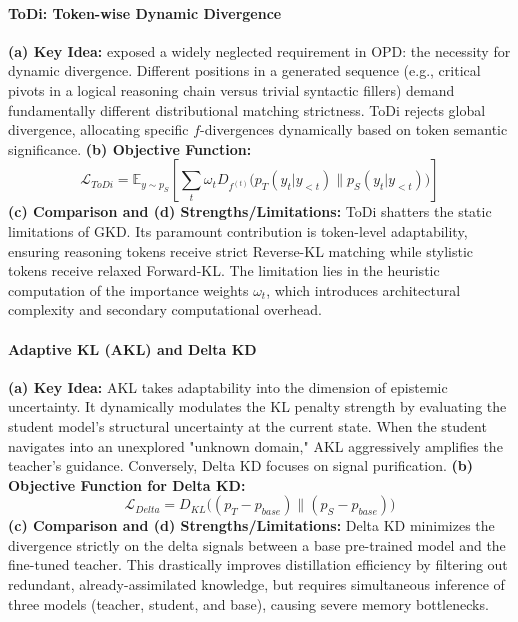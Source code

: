 \documentclass{article} %
\begin{document}
\paragraph{ToDi: Token-wise Dynamic Divergence}
\textbf{(a) Key Idea:} \citet{2505.16297} exposed a widely neglected requirement in OPD: the necessity for dynamic divergence. Different positions in a generated sequence (e.g., critical pivots in a logical reasoning chain versus trivial syntactic fillers) demand fundamentally different distributional matching strictness. ToDi rejects global divergence, allocating specific $f$-divergences dynamically based on token semantic significance.
\textbf{(b) Objective Function:}
\begin{equation}
    \mathcal{L}_{ToDi} = \mathbb{E}_{y \sim p_S} \left[ \sum_t \omega_t D_{f^{(t)}} \big( p_T(y_t|y_{<t}) \parallel p_S(y_t|y_{<t}) \big) \right]
    \label{eq:todi}
\end{equation}
\textbf{(c) Comparison and (d) Strengths/Limitations:} ToDi shatters the static limitations of GKD. Its paramount contribution is token-level adaptability, ensuring reasoning tokens receive strict Reverse-KL matching while stylistic tokens receive relaxed Forward-KL. The limitation lies in the heuristic computation of the importance weights $\omega_t$, which introduces architectural complexity and secondary computational overhead.

\paragraph{Adaptive KL (AKL) and Delta KD}
\textbf{(a) Key Idea:} AKL \citep{2410.14425} takes adaptability into the dimension of epistemic uncertainty. It dynamically modulates the KL penalty strength by evaluating the student model's structural uncertainty at the current state. When the student navigates into an unexplored "unknown domain," AKL aggressively amplifies the teacher's guidance.
Conversely, Delta KD \citep{2509.14526} focuses on signal purification.
\textbf{(b) Objective Function for Delta KD:}
\begin{equation}
    \mathcal{L}_{Delta} = D_{KL}\big( (p_T - p_{base}) \parallel (p_S - p_{base}) \big)
\end{equation}
\textbf{(c) Comparison and (d) Strengths/Limitations:} Delta KD minimizes the divergence strictly on the delta signals between a base pre-trained model and the fine-tuned teacher. This drastically improves distillation efficiency by filtering out redundant, already-assimilated knowledge, but requires simultaneous inference of three models (teacher, student, and base), causing severe memory bottlenecks.
\end{document}

